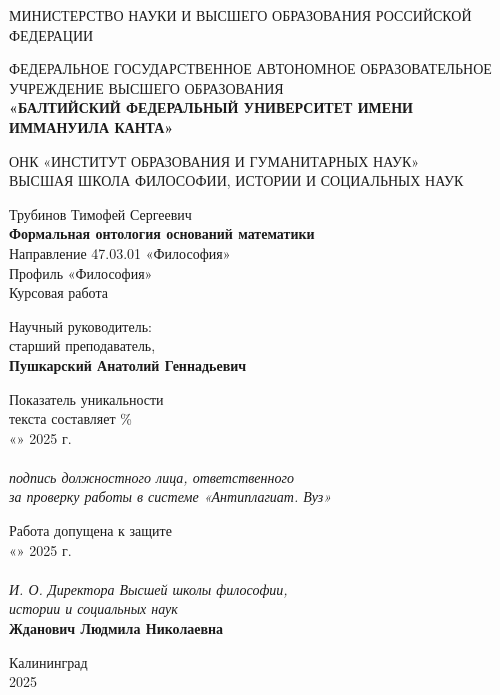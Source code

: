 \begin{titlepage}
	\centering
	\small
	МИНИСТЕРСТВО НАУКИ И ВЫСШЕГО ОБРАЗОВАНИЯ РОССИЙСКОЙ ФЕДЕРАЦИИ
	
	ФЕДЕРАЛЬНОЕ ГОСУДАРСТВЕННОЕ АВТОНОМНОЕ ОБРАЗОВАТЕЛЬНОЕ УЧРЕЖДЕНИЕ ВЫСШЕГО ОБРАЗОВАНИЯ\\
	\textbf{«БАЛТИЙСКИЙ ФЕДЕРАЛЬНЫЙ УНИВЕРСИТЕТ ИМЕНИ ИММАНУИЛА КАНТА»}
	
	ОНК «ИНСТИТУТ ОБРАЗОВАНИЯ И ГУМАНИТАРНЫХ НАУК»\\
	ВЫСШАЯ ШКОЛА ФИЛОСОФИИ, ИСТОРИИ И СОЦИАЛЬНЫХ НАУК
	
	\vfill
	
	\large
	Трубинов Тимофей Сергеевич\\[0.5em]
	\textbf{Формальная онтология оснований математики}\\[0.5em]
	
	\small
	Направление 47.03.01 «Философия»\\
	Профиль «Философия»\\
	Курсовая работа
	
	\vfill
	\begin{flushright}
	Научный руководитель:\\
	старший преподаватель,\\
	\textbf{Пушкарский Анатолий Геннадьевич}\\[2em]
	\end{flushright}
	
	\begin{flushleft}
	Показатель уникальности \\
	текста составляет \underline{\hspace{2cm}} \%\\[1em]
	«\underline{\hspace{1cm}}» \underline{\hspace{3cm}} 2025 г.\\
	\underline{\hspace{6cm}}\\
	\textit{подпись должностного лица, ответственного \\
		 за проверку работы в системе «Антиплагиат. Вуз»}
	
	\vspace{2em}
	
	Работа допущена к защите\\
	«\underline{\hspace{1cm}}» \underline{\hspace{3cm}} 2025 г.\\
	\underline{\hspace{6cm}}\\
	\textit{И. О. Директора Высшей школы философии,\\
	истории и социальных наук}\\
	\textbf{Жданович Людмила Николаевна}	
	\vfill
	\end{flushleft}
	Калининград \\
	2025
\end{titlepage}
